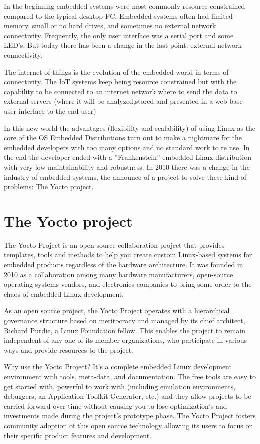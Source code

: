 In the beginning embedded systems were most commonly resource constrained
compared to the typical desktop PC. Embedded systems often had limited memory,
small or no hard drives, and sometimes no external network connectivity.
Frequently, the only user interface was a serial port and some LED's. But today
there has been a change in the last point: external network connectivity.

The internet of things is the evolution of the embedded world in terms of
connectivity. The IoT systems keep being resource constrained but with the
capability to be connected to an internet network where to send the data to
external servers (where it will be analyzed,stored and presented in a web base
user interface to the end user)

In this new world the advantages (flexibility and scalability) of using Linux
as the core of the OS Embedded Distributions turn out to make a nightmare for
the embedded developers with too many options and no standard work to re use.
In the end the developer ended with a ''Frankenstein'' embedded Linux
distribution with very low maintainability and robustness. In 2010 there was a
change in the industry of embedded systems, the announce of a project to solve
these kind of problems: The Yocto project.

\section{The Yocto project}
\noindent
The Yocto Project is an open source collaboration project that provides
templates, tools and methods to help you create custom Linux-based systems for
embedded products regardless of the hardware architecture. It was founded in
2010 as a collaboration among many hardware manufacturers, open-source
operating systems vendors, and electronics companies to bring some order to the
chaos of embedded Linux development.\cite{yocto-project}

As an open source project, the Yocto Project operates with a hierarchical
governance structure based on meritocracy and managed by its chief architect,
Richard Purdie, a Linux Foundation fellow. This enables the project to remain
independent of any one of its member organizations, who participate in various
ways and provide resources to the project.

Why use the Yocto Project? It's a complete embedded Linux development
environment with tools, meta-data, and documentation. The
free tools are easy to get started with, powerful to work with (including
emulation environments, debuggers, an Application Toolkit Generator, etc.) and
they allow projects to be carried forward over time without causing you to lose
optimization's and investments made during the project's prototype phase. The
Yocto Project fosters community adoption of this open source technology
allowing its users to focus on their specific product features and development.

